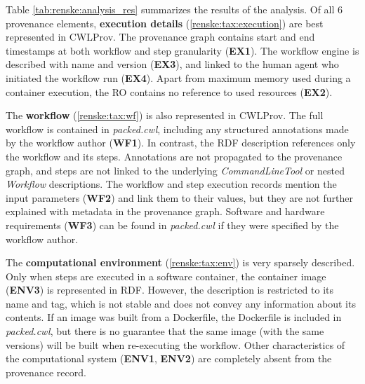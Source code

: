 Table \ref{tab:renske:analysis_res} summarizes the  results of the analysis.
Of all 6 provenance elements, \textbf{execution details} (\ref{renske:tax:execution}) are best represented in CWLProv. The provenance graph contains start and end timestamps at both workflow and step granularity %
(\textbf{EX1}). The workflow engine is described with name and version (\textbf{EX3}), and linked to the human agent who initiated the workflow run (\textbf{EX4}). Apart from maximum memory used during a container execution, the RO contains no reference to used resources (\textbf{EX2}). 

The \textbf{workflow} (\ref{renske:tax:wf}) is also represented in CWLProv. The full workflow is contained in \emph{packed.cwl}, including any structured annotations made by the workflow author (\textbf{WF1}). In contrast, the RDF description references only the workflow and its steps. Annotations are not propagated to the provenance graph, and steps are not linked to the underlying \emph{CommandLineTool} or nested \emph{Workflow} descriptions. The workflow and step execution records mention the input parameters (\textbf{WF2}) and link them to their values, but they are not further explained with metadata in the provenance graph. 
Software and hardware requirements (\textbf{WF3}) can be found in \emph{packed.cwl} if they were specified by the workflow author.

The \textbf{computational environment} (\ref{renske:tax:env}) is very sparsely described. Only when steps are executed in a software container, the container image (\textbf{ENV3}) is represented in RDF. However, the description is restricted to its name and tag, which is not stable and does not convey any information about its contents. If an image was built from a Dockerfile, the Dockerfile is included in \emph{packed.cwl}, but there is no guarantee that the same image (with the same versions) will be built when re-executing the workflow. Other characteristics of the computational system (\textbf{ENV1}, \textbf{ENV2}) are completely absent from the provenance record.

